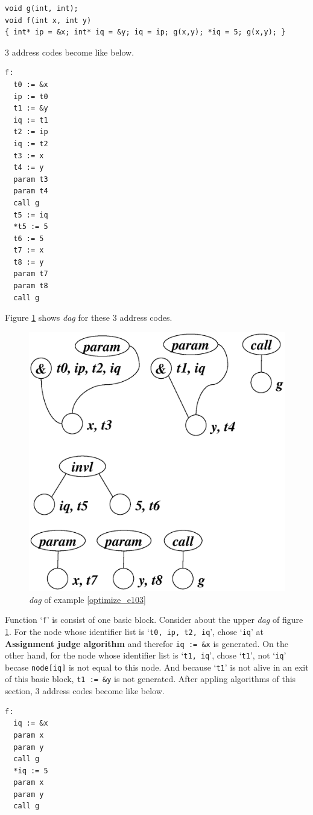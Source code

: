 \begin{Example}
\begin{verbatim}
void g(int, int);
void f(int x, int y)
{ int* ip = &x; int* iq = &y; iq = ip; g(x,y); *iq = 5; g(x,y); }
\end{verbatim}
3 address codes become like below.
\begin{verbatim}
f:
  t0 := &x
  ip := t0
  t1 := &y
  iq := t1
  t2 := ip
  iq := t2
  t3 := x
  t4 := y
  param t3
  param t4
  call g
  t5 := iq
  *t5 := 5
  t6 := 5
  t7 := x
  t8 := y
  param t7
  param t8
  call g
\end{verbatim}
Figure \ref{optimize_e104} shows {\em dag} for these 3 address codes.
\begin{figure}[htbp]
\begin{center}
\includegraphics[width=0.788\linewidth,height=0.8\linewidth]{opt045.eps}
\caption{{\em dag} of example \ref{optimize_e103}}
\label{optimize_e104}
\end{center}
\end{figure}
Function `{\tt{f}}' is consist of one basic block.
Consider about the upper {\em dag} of figure \ref{optimize_e104}.
For the node whose identifier list is `{\tt{t0, ip, t2, iq}}',
chose `{\tt{iq}}' at {\bf Assignment judge algorithm} and
therefor {\tt{iq := \&x}} is generated.
On the other hand, for the node whose identifier list
is `{\tt{t1, iq}}', chose `{\tt{t1}}', not `{\tt{iq}}'
becase {\tt{node[iq]}} is not equal to this node. 
And because `{\tt{t1}}' is not alive in an exit of this basic
block, {\tt{t1 := \&y}} is not generated.
After appling algorithms of this section,
3 address codes become like below.
\begin{verbatim}
f:
  iq := &x
  param x
  param y
  call g
  *iq := 5
  param x
  param y
  call g
\end{verbatim}
\end{Example}

